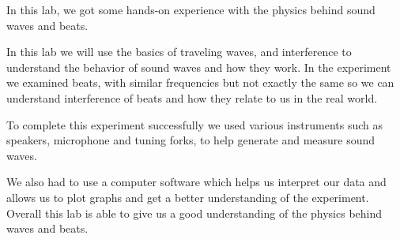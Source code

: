 {In this lab, we got some hands-on experience with the physics behind sound waves and beats.}

{In this lab we will use the basics of traveling waves, and interference to understand the behavior of sound waves and how they work. In the experiment we examined beats, with similar frequencies but not exactly the same so we can understand interference of beats and how they relate to us in the real world.}

{To complete this experiment successfully we used various instruments such as speakers, microphone and tuning forks, to help generate and measure sound waves.}

{We also had to use a computer software which helps us interpret our data and allows us to plot graphs and get a better understanding of the experiment. Overall this lab is able to give us a good understanding of the physics behind waves and beats.}

